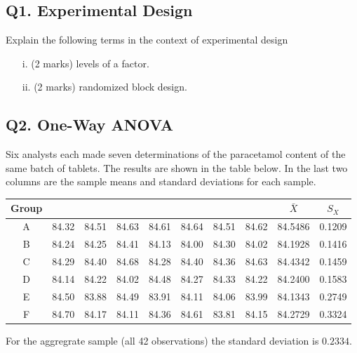 \documentclass[a4paper,12pt]{article}
\begin{document}
	\subsection*{Q1. Experimental Design }
	
	
	Explain the following terms in the context of experimental design
	\begin{itemize}
		\item[i.] (2 marks) levels of a factor.
		\item[ii.] (2 marks) randomized block design.
	\end{itemize}
	
	\subsection*{Q2. One-Way ANOVA } %
	Six analysts each made seven determinations of the paracetamol content of the same batch of tablets.
	The results are shown in the table below. In the last two columns are the sample means and standard deviations for each sample.\\
	\bigskip
	
	\begin{tabular}{|c|ccccccc|c|c|}
		\hline
		Group &  & &  &  &  &  &  & $\bar{X}$& $S_{X}$ \\ \hline
		A & 84.32 & 84.51 & 84.63 & 84.61 & 84.64 & 84.51 & 84.62 & 84.5486 & 0.1209 \\ \hline
		B & 84.24 & 84.25 & 84.41 & 84.13 & 84.00 & 84.30 & 84.02 & 84.1928 & 0.1416 \\ \hline
		C & 84.29 & 84.40 & 84.68 & 84.28 & 84.40 & 84.36 & 84.63 & 84.4342 & 0.1459 \\ \hline
		D & 84.14 & 84.22 & 84.02 & 84.48 & 84.27 & 84.33 & 84.22 & 84.2400 & 0.1583 \\ \hline
		E & 84.50 & 83.88 & 84.49 & 83.91 & 84.11 & 84.06 & 83.99 & 84.1343 & 0.2749 \\ \hline
		F & 84.70 & 84.17 & 84.11 & 84.36 & 84.61 & 83.81 & 84.15 & 84.2729 & 0.3324 \\ \hline
	\end{tabular} 
	

	
	
	\bigskip
	For the aggregrate sample (all 42 observations) the standard deviation is $0.2334$.
	
\end{document}
